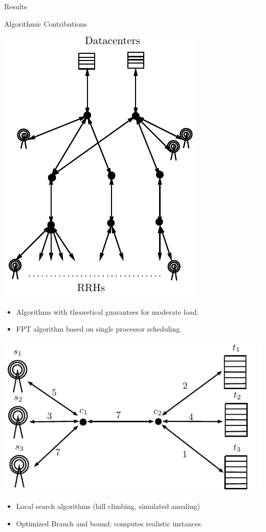 \documentclass[10 pt]{beamer}
\begin{document}
\begin{section}{Results}


\begin{frame}{Algorithmic Contributions}


   \begin{multicols}{2}
   \includegraphics[scale=0.5]{extendendgraphgrey}\\
   \begin{itemize}
   \item Algorithms with theoretical guarantees for moderate load.
   \item FPT algorithm based on single processor scheduling.
   \end{itemize}
   \vspace{1cm}
\includegraphics[scale=0.5]{starfronthaul}
   \begin{itemize}
    \item Local search algorithms (hill climbing, simulated anealing) 
       \item Optimized Branch and bound: computes realistic instances.
   \end{itemize}
   \end{multicols}
\end{frame}



\end{section}
\end{document}
